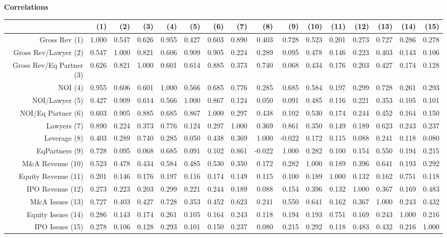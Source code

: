 \documentclass{article}
\begin{document}
\newpage
{\large \textbf{Correlations} }%
\begin{table}[H]
\centering
\begin{tabular}{rrrrrrrrrrrrrrrr}
  \hline
 & (1) & (2) & (3) & (4) & (5) & (6) & (7) & (8) & (9) & (10) & (11) & (12) & (13) & (14) & (15) \\ 
  \hline
Gross Rev (1) & 1.000 & 0.547 & 0.626 & 0.955 & 0.427 & 0.603 & 0.890 & 0.403 & 0.728 & 0.523 & 0.201 & 0.273 & 0.727 & 0.286 & 0.278 \\ 
  Gross Rev/Lawyer (2) & 0.547 & 1.000 & 0.821 & 0.606 & 0.909 & 0.905 & 0.224 & 0.289 & 0.095 & 0.478 & 0.146 & 0.223 & 0.403 & 0.143 & 0.106 \\ 
  Gross Rev/Eq Partner (3) & 0.626 & 0.821 & 1.000 & 0.601 & 0.614 & 0.885 & 0.373 & 0.740 & 0.068 & 0.434 & 0.176 & 0.203 & 0.427 & 0.174 & 0.128 \\ 
  NOI (4) & 0.955 & 0.606 & 0.601 & 1.000 & 0.566 & 0.685 & 0.776 & 0.285 & 0.685 & 0.584 & 0.197 & 0.299 & 0.728 & 0.261 & 0.293 \\ 
  NOI/Lawyer (5) & 0.427 & 0.909 & 0.614 & 0.566 & 1.000 & 0.867 & 0.124 & 0.050 & 0.091 & 0.485 & 0.116 & 0.221 & 0.353 & 0.105 & 0.101 \\ 
  NOI/Eq Partner (6) & 0.603 & 0.905 & 0.885 & 0.685 & 0.867 & 1.000 & 0.297 & 0.438 & 0.102 & 0.530 & 0.174 & 0.244 & 0.452 & 0.164 & 0.150 \\ 
  Lawyers (7) & 0.890 & 0.224 & 0.373 & 0.776 & 0.124 & 0.297 & 1.000 & 0.369 & 0.861 & 0.350 & 0.149 & 0.189 & 0.623 & 0.243 & 0.237 \\ 
  Leverage (8) & 0.403 & 0.289 & 0.740 & 0.285 & 0.050 & 0.438 & 0.369 & 1.000 & -0.022 & 0.172 & 0.115 & 0.088 & 0.241 & 0.118 & 0.080 \\ 
  EqPartners (9) & 0.728 & 0.095 & 0.068 & 0.685 & 0.091 & 0.102 & 0.861 & -0.022 & 1.000 & 0.282 & 0.100 & 0.154 & 0.550 & 0.194 & 0.215 \\ 
  M\&A Revenue (10) & 0.523 & 0.478 & 0.434 & 0.584 & 0.485 & 0.530 & 0.350 & 0.172 & 0.282 & 1.000 & 0.189 & 0.396 & 0.641 & 0.193 & 0.292 \\ 
  Equity Revenue (11) & 0.201 & 0.146 & 0.176 & 0.197 & 0.116 & 0.174 & 0.149 & 0.115 & 0.100 & 0.189 & 1.000 & 0.132 & 0.162 & 0.751 & 0.118 \\ 
  IPO Revenue (12) & 0.273 & 0.223 & 0.203 & 0.299 & 0.221 & 0.244 & 0.189 & 0.088 & 0.154 & 0.396 & 0.132 & 1.000 & 0.367 & 0.169 & 0.483 \\ 
  M\&A Issues (13) & 0.727 & 0.403 & 0.427 & 0.728 & 0.353 & 0.452 & 0.623 & 0.241 & 0.550 & 0.641 & 0.162 & 0.367 & 1.000 & 0.243 & 0.432 \\ 
  Equity Issues (14) & 0.286 & 0.143 & 0.174 & 0.261 & 0.105 & 0.164 & 0.243 & 0.118 & 0.194 & 0.193 & 0.751 & 0.169 & 0.243 & 1.000 & 0.216 \\ 
  IPO Issues (15) & 0.278 & 0.106 & 0.128 & 0.293 & 0.101 & 0.150 & 0.237 & 0.080 & 0.215 & 0.292 & 0.118 & 0.483 & 0.432 & 0.216 & 1.000 \\ 
   \hline
\end{tabular}
\end{table}
\end{document}
